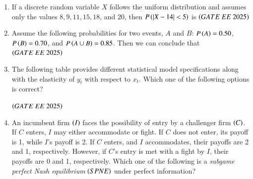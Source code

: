 \documentclass[journal,12pt,onecolumn]{IEEEtran}
\theoremstyle{remark}
\begin{document}
\begin{enumerate}
\begin{enumerate}
\begin{multicols}{4}
    \end{multicols}
\end{enumerate}
\item If a discrete random variable $X$ follows the uniform distribution and assumes only the values $8, 9, 11, 15, 18$, and $20$, then $P \left(|X - 14| < 5\right)$ is
\hfill $\brak{GATE\ EE\ 2025}$
\begin{enumerate}
\end{enumerate}
\item Assume the following probabilities for two events, $A$ and $B$: $P \left(A\right) = 0.50$, $P \left(B\right) = 0.70$, and $P \left(A \cup B\right) = 0.85$. Then we can conclude that
\hfill $\brak{GATE\ EE\ 2025}$
\begin{enumerate}
\end{enumerate}
\item The following table provides different statistical model specifications along with the elasticity of $y_t$ with respect to $x_t$. Which one of the following options is correct?
\begin{table}[H]
\centering

\end{table}
\hfill $\brak{GATE\ EE\ 2025}$
\begin{enumerate}
\end{enumerate}
\item An incumbent firm $\left(I\right)$ faces the possibility of entry by a challenger firm $\left(C\right)$. If $C$ enters, $I$ may either accommodate or fight. If $C$ does not enter, its payoff is 1, while $I$'s payoff is 2. If $C$ enters, and $I$ accommodates, their payoffs are 2 and 1, respectively. However, if $C$'s entry is met with a fight by $I$, their payoffs are 0 and 1, respectively. Which one of the following is a \textit{subgame perfect Nash equilibrium} $\left(SPNE\right)$ under perfect information?

\end{enumerate}
\end{document}
